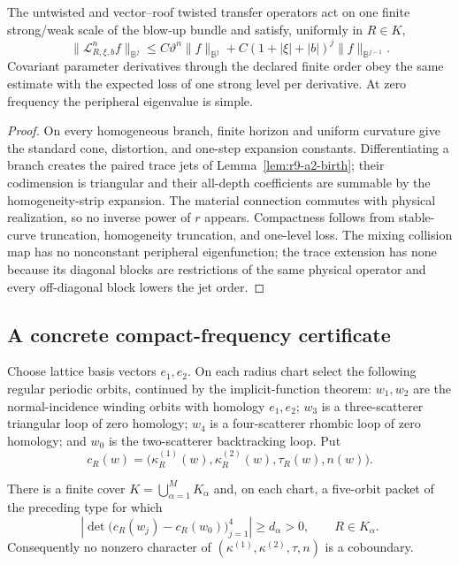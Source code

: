 \begin{theorem}
\label{thm:r9-a2-bundle}
The untwisted and vector--roof twisted transfer operators act on one finite
strong/weak scale of the blow-up bundle and satisfy, uniformly in $R\in K$,
\[
 \|\mathcal L_{R,\xi,b}^nf\|_{\mathbb B^j}
 \le C\vartheta^n\|f\|_{\mathbb B^j}
   +C(1+|\xi|+|b|)^j\|f\|_{\mathbb B^{j-1}}.
\]
Covariant parameter derivatives through the declared finite order obey the
same estimate with the expected loss of one strong level per derivative.
At zero frequency the peripheral eigenvalue is simple.
\end{theorem}

\begin{proof}
On every homogeneous branch, finite horizon and uniform curvature give the
standard cone, distortion, and one-step expansion constants.  Differentiating
a branch creates the paired trace jets of Lemma~\ref{lem:r9-a2-birth}; their
codimension is triangular and their all-depth coefficients are summable by
the homogeneity-strip expansion.  The material connection commutes with
physical realization, so no inverse power of $r$ appears.  Compactness follows
from stable-curve truncation, homogeneity truncation, and one-level loss.  The
mixing collision map has no nonconstant peripheral eigenfunction; the trace
extension has none because its diagonal blocks are restrictions of the same
physical operator and every off-diagonal block lowers the jet order.
\end{proof}

\subsection{A concrete compact-frequency certificate}

Choose lattice basis vectors $e_1,e_2$.  On each radius chart select the
following regular periodic orbits, continued by the implicit-function theorem:
$w_1,w_2$ are the normal-incidence winding orbits with homology $e_1,e_2$;
$w_3$ is a three-scatterer triangular loop of zero homology; $w_4$ is a
four-scatterer rhombic loop of zero homology; and $w_0$ is the two-scatterer
backtracking loop.  Put
\[
 c_R(w)=\bigl(\kappa_R^{(1)}(w),\kappa_R^{(2)}(w),
              \tau_R(w),n(w)\bigr).
\]

\begin{lemma}
\label{lem:r9-a2-arithmetic}
There is a finite cover $K=\bigcup_{\alpha=1}^M K_\alpha$ and, on each chart,
a five-orbit packet of the preceding type for which
\[
 \left|\det\bigl(c_R(w_j)-c_R(w_0)\bigr)_{j=1}^4\right|
 \ge d_\alpha>0,
 \qquad R\in K_\alpha.
\]
Consequently no nonzero character of
$(\kappa^{(1)},\kappa^{(2)},\tau,n)$ is a coboundary.
\end{lemma}

